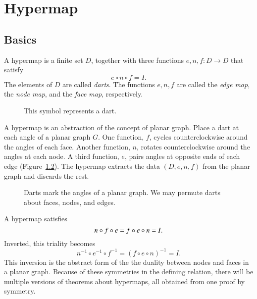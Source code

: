 
\def\e{\varepsilonup}
\chapter{Hypermap}\label{chap:hypermap}

\section{Basics}



\begin{definition}[hypermap]\label{def:hypermap}  A hypermap is a finite set $D$, together with
three functions $e,n,f:D\to D$ that satisfy
    $$e\circ n\circ f = I.$$
The elements of $D$ are called {\it darts}.  The functions $e,n,f$
are called the {\it edge map}, the {\it node map}, and the {\it
face map}, respectively.
\end{definition}


\begin{figure}[htb]
  \centering
  \caption{This symbol represents a dart.}
  \label{fig:dart}
\end{figure}

\begin{remark} A hypermap is an abstraction of
the concept of 
planar graph.  Place a dart at each angle of a planar graph $G$.
One function, $f$, 
cycles counterclockwise around the angles of each face.  
Another function, $n$, 
rotates counterclockwise around the angles at each
node.  A third function, $e$, pairs angles at opposite ends of
each edge  (Figure~\ref{fig:hypermap_ex}).   The hypermap extracts
the data $(D,e,n,f)$ from the planar graph and discards the rest.
\end{remark}

\begin{figure}[htb]
  \centering
  \caption{Darts mark the angles of a planar graph.  We may
  permute darts about faces, nodes, and edges.}
  \label{fig:hypermap_ex}
\end{figure}

A hypermap satisfies 
  \begin{equation}\tlabel{eqn:triality}
  n\circ f\circ e = f\circ e\circ n = I.
  \end{equation}
Inverted, this triality becomes
   $$
   n^{-1} \circ e^{-1} \circ f^{-1} = (f \circ e \circ n)^{-1} = I.
   $$
This inversion
is the abstract form of the
the duality between nodes and faces in a planar graph.  
Because of
these symmetries in the defining relation, 
there will be multiple versions of 
theorems about hypermaps,
all obtained from one proof by symmetry.

